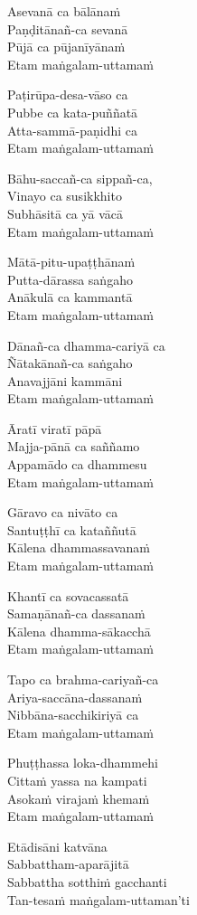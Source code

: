 \begin{paritta}
Asevanā ca bālānaṁ\\
Paṇḍitānañ-ca sevanā\\
Pūjā ca pūjanīyānaṁ\\
Etam maṅgalam-uttamaṁ

Paṭirūpa-desa-vāso ca\\
Pubbe ca kata-puññatā\\
Atta-sammā-paṇidhi ca\\
Etam maṅgalam-uttamaṁ

\clearpage

Bāhu-saccañ-ca sippañ-ca,\\
Vinayo ca susikkhito\\
Subhāsitā ca yā vācā\\
Etam maṅgalam-uttamaṁ

Mātā-pitu-upaṭṭhānaṁ\\
Putta-dārassa saṅgaho\\
Anākulā ca kammantā\\
Etam maṅgalam-uttamaṁ

Dānañ-ca dhamma-cariyā ca\\
Ñātakānañ-ca saṅgaho\\
Anavajjāni kammāni\\
Etam maṅgalam-uttamaṁ

Āratī viratī pāpā\\
Majja-pānā ca saññamo\\
Appamādo ca dhammesu\\
Etam maṅgalam-uttamaṁ

Gāravo ca nivāto ca\\
Santuṭṭhī ca kataññutā\\
Kālena dhammassavanaṁ\\
Etam maṅgalam-uttamaṁ

Khantī ca sovacassatā\\
Samaṇānañ-ca dassanaṁ\\
Kālena dhamma-sākacchā\\
Etam maṅgalam-uttamaṁ

\clearpage

Tapo ca brahma-cariyañ-ca\\
Ariya-saccāna-dassanaṁ\\
Nibbāna-sacchikiriyā ca\\
Etam maṅgalam-uttamaṁ

Phuṭṭhassa loka-dhammehi\\
Cittaṁ yassa na kampati\\
Asokaṁ virajaṁ khemaṁ\\
Etam maṅgalam-uttamaṁ

Etādisāni katvāna\\
Sabbattham-aparājitā\\
Sabbattha sotthiṁ gacchanti\\
Tan-tesaṁ maṅgalam-uttaman'ti
\end{paritta}

